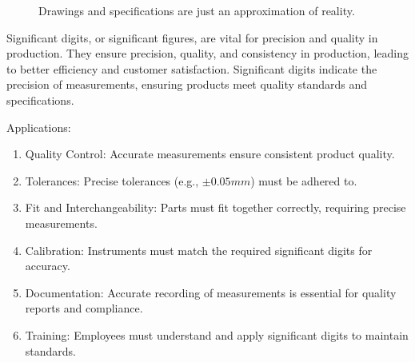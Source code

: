 \documentclass[
  a4paper,
]{scrbook}
\providecommand{\tightlist}{%
  \setlength{\itemsep}{0pt}\setlength{\parskip}{0pt}}\usepackage{longtable,booktabs,array}
\begin{document}
\begin{figure}[ht]


\caption{\label{fig-sign-digits}Drawings and specifications are just an
approximation of reality.}

\end{figure}%

Significant digits, or significant figures, are vital for precision and
quality in production. They ensure precision, quality, and consistency
in production, leading to better efficiency and customer satisfaction.
Significant digits indicate the precision of measurements, ensuring
products meet quality standards and specifications.

Applications:

\begin{enumerate}
\def\labelenumi{\arabic{enumi}.}
\tightlist
\item
  Quality Control: Accurate measurements ensure consistent product
  quality.
\item
  Tolerances: Precise tolerances (e.g., \(\pm0.05 mm\)) must be adhered
  to.
\item
  Fit and Interchangeability: Parts must fit together correctly,
  requiring precise measurements.
\item
  Calibration: Instruments must match the required significant digits
  for accuracy.
\item
  Documentation: Accurate recording of measurements is essential for
  quality reports and compliance.
\item
  Training: Employees must understand and apply significant digits to
  maintain standards.
\end{enumerate}
\end{document}

